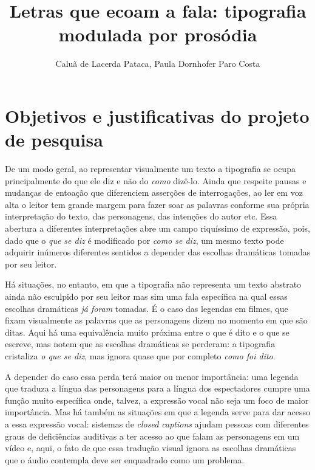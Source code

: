 \documentclass[a4paper]{tufte-handout}
\title{Letras que ecoam a fala: tipografia modulada por prosódia}
\author{Caluã de Lacerda Pataca, Paula Dornhofer Paro Costa}
\date{}  %
\begin{document}
\maketitle%



\section{Objetivos e justificativas do projeto de pesquisa}\label{sec:objetivos}

De um modo geral, ao representar visualmente um texto a tipografia se ocupa principalmente do que ele diz e não do \textit{como} dizê-lo. Ainda que respeite pausas e mudanças de entoação que diferenciem asserções de interrogações, ao ler em voz alta o leitor tem grande margem para fazer soar as palavras conforme sua própria interpretação do texto, das personagens, das intenções do autor etc. Essa abertura a diferentes interpretações abre um campo riquíssimo de expressão, pois, dado que o \textit{que se diz} é modificado por \textit{como se diz}, um mesmo texto pode adquirir inúmeros diferentes sentidos a depender das escolhas dramáticas tomadas por seu leitor.

Há situações, no entanto, em que a tipografia não representa um texto abstrato ainda não esculpido por seu leitor mas sim uma fala específica na qual essas escolhas dramáticas \textit{já foram} tomadas. É o caso das legendas em filmes, que fixam visualmente as palavras que as personagens dizem no momento em que são ditas. Aqui há uma equivalência muito próxima entre o que é dito e o que se escreve, mas notem que as escolhas dramáticas se perderam: a tipografia cristaliza \textit{o que se diz}, mas ignora quase que por completo \textit{como foi dito}. 

A depender do caso essa perda terá maior ou menor importância: uma legenda que traduza a língua das personagens para a língua dos espectadores cumpre uma função muito específica onde, talvez, a expressão vocal não seja um foco de maior importância. Mas há também as situações em que a legenda serve para dar acesso a essa expressão vocal: sistemas de \textit{closed captions} ajudam pessoas com diferentes graus de deficiências auditivas a ter acesso ao que falam as personagens em um vídeo e, aqui, o fato de que essa tradução visual ignora as escolhas dramáticas que o áudio contempla deve ser enquadrado como um problema. 
\end{document}
